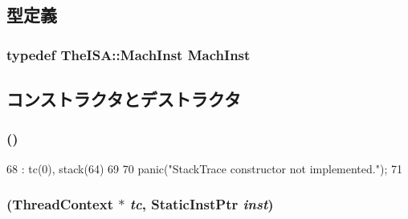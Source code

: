 \subsection{型定義}
\hypertarget{classPowerISA_1_1StackTrace_a4617f528417b8f55f809ae0988284c9b}{
\subsubsection[{MachInst}]{\setlength{\rightskip}{0pt plus 5cm}typedef TheISA::MachInst {\bf MachInst}}}
\label{classPowerISA_1_1StackTrace_a4617f528417b8f55f809ae0988284c9b}


\subsection{コンストラクタとデストラクタ}
\hypertarget{classPowerISA_1_1StackTrace_a5a9b2e3bba2262e73b20f87325efd063}{
\subsubsection[{StackTrace}]{ ()}}
\label{classPowerISA_1_1StackTrace_a5a9b2e3bba2262e73b20f87325efd063}



\begin{DoxyCode}
68     : tc(0), stack(64)
69 {
70     panic("StackTrace constructor not implemented.\n");
71 }
\end{DoxyCode}
\hypertarget{classPowerISA_1_1StackTrace_a7c751415d8c87372fc7d24513309cf1b}{
\subsubsection[{StackTrace}]{ ({\bf ThreadContext} $\ast$ {\em tc}, \/  {\bf StaticInstPtr} {\em inst})}}
\label{classPowerISA_1_1StackTrace_a7c751415d8c87372fc7d24513309cf1b}



